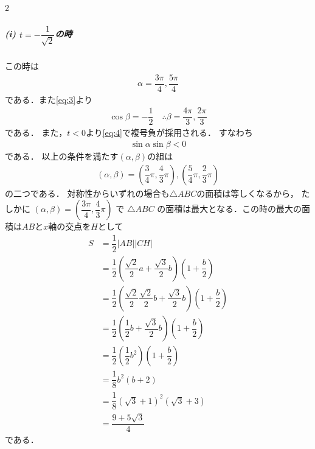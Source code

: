 \documentclass[../../main.tex]{subfiles}
\begin{document}
\begin{multicols}{2}
  \subparagraph{(i) $t = -\dfrac{1}{\sqrt{2}}$の時}

  この時は
  \begin{align}
    \alpha = \dfrac{3\pi}{4}, \dfrac{5\pi}{4}
  \end{align}
  である．また\cref{eq:3}より
  \begin{align}
    \cos\beta = -\dfrac{1}{2}
    \quad\therefore
    \beta = \dfrac{4\pi}{3},\dfrac{2\pi}{3}
  \end{align}
  である．
  また，$t<0$より\cref{eq:4}で複号負が採用される．
  すなわち
  \begin{align}
    \sin\alpha \sin\beta < 0
  \end{align}
  である．
  以上の条件を満たす$(\alpha,\beta)$の組は
  \begin{align}
    (\alpha,\beta) = (\dfrac{3}{4}\pi, \dfrac{4}{3}\pi), (\dfrac{5}{4}\pi, \dfrac{2}{3}\pi)
  \end{align}
  の二つである．
  対称性からいずれの場合も$\triangle ABC$の面積は等しくなるから，
  たしかに $(\alpha,\beta) = (\dfrac{3\pi}{4}, \dfrac{4}{3}\pi)$ で $\triangle ABC$ の面積は最大となる．この時の最大の面積は$AB$と$x$軸の交点を$H$として
  \begin{align}
    S
    &= \dfrac{1}{2}|AB||CH| \\
    &= \dfrac{1}{2}\left(\dfrac{\sqrt{2}}{2}a+\dfrac{\sqrt{3}}{2}b\right)\left(1+\dfrac{b}{2}\right) \\
    &= \dfrac{1}{2}\left(\dfrac{\sqrt{2}}{2}\dfrac{\sqrt{2}}{2}b+\dfrac{\sqrt{3}}{2}b\right)\left(1+\dfrac{b}{2}\right) \\
    &= \dfrac{1}{2}\left(\dfrac{1}{2}b+\dfrac{\sqrt{3}}{2}b\right)\left(1+\dfrac{b}{2}\right) \\
    &= \dfrac{1}{2}\left(\dfrac{1}{2}b^2\right)\left(1+\dfrac{b}{2}\right) \\
    &= \dfrac{1}{8}b^2\left(b+2\right) \\
    &= \dfrac{1}{8}(\sqrt{3}+1)^2(\sqrt{3}+3) \\
    &= \dfrac{9+5\sqrt{3}}{4}
  \end{align}
  である．

  \begin{figure}[H]
    \centering
\end{figure}
\end{multicols}
\end{document}

